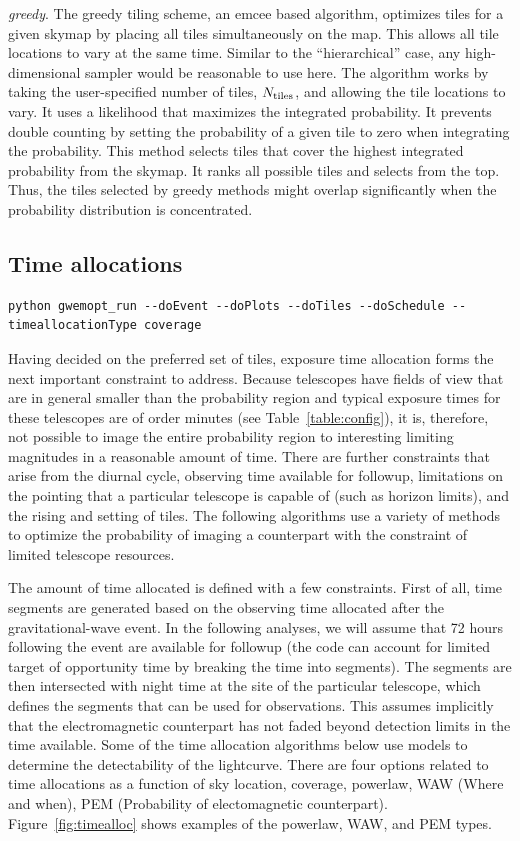 \documentclass[twocolumn]{aastex62}
\begin{document}
\emph{greedy}. The greedy tiling scheme, an emcee \citep{FoHo2013} based algorithm, optimizes tiles for a given skymap by placing all tiles simultaneously on the map. This allows all tile locations to vary at the same time. Similar to the ``hierarchical'' case, any high-dimensional sampler would be reasonable to use here. The algorithm works by taking the user-specified number of tiles, $N_{\rm tiles}$, and allowing the tile locations to vary. It uses a likelihood that maximizes the integrated probability. It prevents double counting by setting the probability of a given tile to zero when integrating the probability. This method selects tiles that cover the highest integrated probability from the skymap. It ranks all possible tiles and selects from the top. Thus, the tiles selected by greedy methods might overlap significantly when the probability distribution is concentrated. 

\subsection{Time allocations}
\label{subsection:timeallocation}
\begin{lstlisting}
python gwemopt_run --doEvent --doPlots --doTiles --doSchedule --timeallocationType coverage
\end{lstlisting}
Having decided on the preferred set of tiles, exposure time allocation forms the next important constraint to
address. 
Because telescopes have fields of view that are in general smaller than the probability region and typical exposure times for these telescopes are of order minutes (see Table~\ref{table:config}), it is, therefore, not possible to image the entire probability region to interesting limiting magnitudes in a reasonable amount of time.
There are further constraints that arise from the diurnal cycle, observing time available for followup, limitations on the pointing that a particular telescope is capable of (such as horizon limits), and the rising and setting of tiles.
The following algorithms use a variety of methods to optimize the probability of imaging a counterpart with the constraint of limited telescope resources.

The amount of time allocated is defined with a few constraints. 
First of all, time segments are generated based on the observing time allocated after the gravitational-wave event. 
In the following analyses, we will assume that 72 hours following the event are available for followup (the code can account for limited target of opportunity time by breaking the time into segments).
The segments are then intersected with night time at the site of the particular telescope, which defines the segments that can be used for observations. 
This assumes implicitly that the electromagnetic counterpart has not faded beyond detection limits in the time available. 
Some of the time allocation algorithms below use models to determine the detectability of the lightcurve.
There are four options related to time allocations as a function of sky location, coverage, powerlaw, WAW (Where and when), PEM (Probability of electomagnetic counterpart). Figure~\ref{fig:timealloc} shows examples of the powerlaw, WAW, and PEM types.
\end{document}
